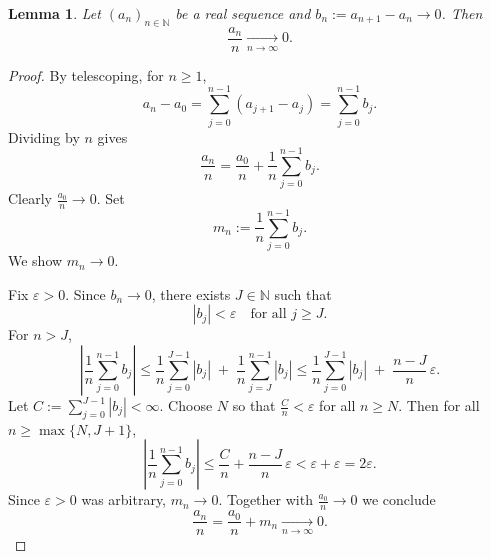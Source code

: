 \documentclass[12pt,a4paper]{article}
\newtheorem{lemma}[theorem]{Lemma}
\theoremstyle{definition}
\theoremstyle{remark}
\begin{document}

\begin{lemma}
Let $(a_n)_{n\in\mathbb{N}}$ be a real sequence and $b_n := a_{n+1}-a_n \to 0$.
Then
\[
\frac{a_n}{n}\xrightarrow[n\to\infty]{} 0.
\]
\end{lemma}

\begin{proof}
By telescoping, for $n\ge 1$,
\[
a_n - a_0 = \sum_{j=0}^{n-1} (a_{j+1}-a_j) = \sum_{j=0}^{n-1} b_j.
\]
Dividing by $n$ gives
\[
\frac{a_n}{n} = \frac{a_0}{n} + \frac{1}{n}\sum_{j=0}^{n-1} b_j.
\]
Clearly $\frac{a_0}{n}\to 0$. Set
\[
m_n := \frac{1}{n}\sum_{j=0}^{n-1} b_j.
\]
We show $m_n\to 0$.

Fix $\varepsilon>0$. Since $b_n\to 0$, there exists $J\in\mathbb{N}$ such that
\[
|b_j|<\varepsilon \quad \text{for all } j\ge J.
\]
For $n>J$,
\[
\left|\frac{1}{n}\sum_{j=0}^{n-1} b_j\right|
\le \frac{1}{n}\sum_{j=0}^{J-1} |b_j| \;+\; \frac{1}{n}\sum_{j=J}^{n-1} |b_j|
\le \frac{1}{n}\sum_{j=0}^{J-1} |b_j| \;+\; \frac{n-J}{n}\,\varepsilon.
\]
Let $C := \sum_{j=0}^{J-1} |b_j| < \infty$. Choose $N$ so that $\frac{C}{n}<\varepsilon$ for all $n\ge N$.
Then for all $n\ge \max\{N,J+1\}$,
\[
\left|\frac{1}{n}\sum_{j=0}^{n-1} b_j\right|
\le \frac{C}{n} + \frac{n-J}{n}\,\varepsilon
< \varepsilon + \varepsilon
= 2\varepsilon.
\]
Since $\varepsilon>0$ was arbitrary, $m_n\to 0$. Together with $\frac{a_0}{n}\to 0$ we conclude
\[
\frac{a_n}{n} = \frac{a_0}{n} + m_n \xrightarrow[n\to\infty]{} 0.
\]
\end{proof}
\end{document}
